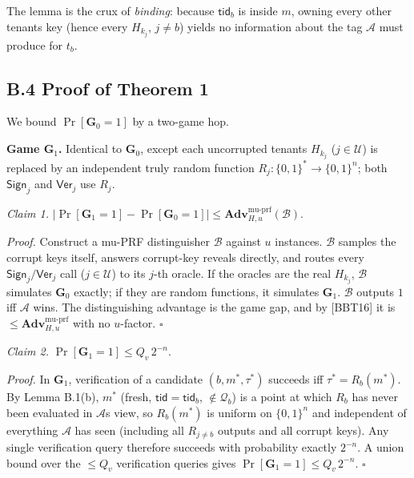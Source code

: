 The lemma is the crux of \emph{binding}: because \(\mathsf{tid}_b\) is
inside \(m\), owning every other tenant\textquotesingle s key (hence
every \(H_{k_j}\), \(j\neq b\)) yields no information about the tag
\(\mathcal{A}\) must produce for \(t_b\).

\subsection{B.4 Proof of Theorem 1}\label{b4-proof-of-theorem-1}

We bound \(\Pr[\mathbf{G}_0=1]\) by a two-game hop.

\textbf{Game \(\mathbf{G}_1\).} Identical to \(\mathbf{G}_0\), except
each uncorrupted tenant\textquotesingle s \(H_{k_j}\)
(\(j\in\mathcal{U}\)) is replaced by an independent truly random
function \(R_j:\{0,1\}^*\to\{0,1\}^n\); both \(\mathsf{Sign}_j\) and
\(\mathsf{Ver}_j\) use \(R_j\).

\emph{Claim 1.} \(\big|\Pr[\mathbf{G}_1=1]-\Pr[\mathbf{G}_0=1]\big|\le
\mathbf{Adv}^{\text{mu-prf}}_{H,u}(\mathcal{B})\).

\emph{Proof.} Construct a mu-PRF distinguisher \(\mathcal{B}\) against
\(u\) instances. \(\mathcal{B}\) samples the corrupt keys itself,
answers corrupt-key reveals directly, and routes every
\(\mathsf{Sign}_j/\mathsf{Ver}_j\) call (\(j\in\mathcal{U}\)) to its
\(j\)-th oracle. If the oracles are the real \(H_{k_j}\),
\(\mathcal{B}\) simulates \(\mathbf{G}_0\) exactly; if they are random
functions, it simulates \(\mathbf{G}_1\). \(\mathcal{B}\) outputs \(1\)
iff \(\mathcal{A}\) wins. The distinguishing advantage is the game gap,
and by {[}BBT16{]} it is \(\le\mathbf{Adv}^{\text{mu-prf}}_{H,u}\) with
no \(u\)-factor. \(\square\)

\emph{Claim 2.} \(\Pr[\mathbf{G}_1=1]\le Q_v\,2^{-n}\).

\emph{Proof.} In \(\mathbf{G}_1\), verification of a candidate
\((b,m^*,\tau^*)\) succeeds iff \(\tau^*=R_b(m^*)\). By Lemma
B.1(b), \(m^*\) (fresh, \(\mathsf{tid}=\mathsf{tid}_b\),
\(\notin\mathcal{Q}_b\)) is a point at which \(R_b\) has never been
evaluated in \(\mathcal{A}\)\textquotesingle s view, so \(R_b(m^*)\) is
uniform on \(\{0,1\}^n\) and independent of everything \(\mathcal{A}\)
has seen (including all \(R_{j\neq b}\) outputs and all corrupt keys).
Any single verification query therefore succeeds with probability
exactly \(2^{-n}\). A union bound over the \(\le Q_v\) verification
queries gives \(\Pr[\mathbf{G}_1=1]\le Q_v\,2^{-n}\). \(\square\)

